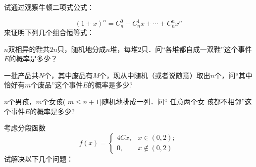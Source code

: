 \documentclass{oxmathproblems}
\begin{document}
\begin{questions}

\miquestion 试通过观察牛顿二项式公式：
  
\[ 
  (1+x)^n = C_{n}^{0}  + C_{n}^{1} x + \cdots + C_{n}^{n} x^n
\]
来证明下列几个组合恒等式：

\miquestion
$n$双相异的鞋共$2n$只，随机地分成$n$堆，每堆$2$只．问“各堆都自成一双鞋”这个事件$E$的概率是多少？




\miquestion
一批产品共$N$个，其中废品有$M$个，现从中随机（或者说随意）取出$n$个，问“其中恰好有$m$个废品”这个事件$E$的概率是多少?

\miquestion
$n$个男孩，$m$个女孩( $m \leq n + 1$)随机地排成一列．问“ 任意两个女
孩都不相邻”这个事件$E$的概率是多少?

\miquestion
考虑分段函数
$$
f(x) = \begin{cases}
  4Cx, &x \in (0,2); \\
  0, &x \notin (0,2)
\end{cases}
$$
试解决以下几个问题：
\end{questions}
\end{document}
